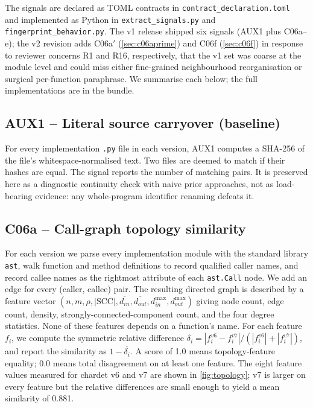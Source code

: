 \documentclass[11pt,letterpaper]{article}
\begin{document}
The signals are declared as TOML contracts in
\texttt{contract\_declaration.toml}~\cite{verivus2026dagtoml} and
implemented as Python in \texttt{extract\_signals.py} and
\texttt{fingerprint\_behavior.py}. The v1 release shipped six
signals (AUX1 plus C06a--e); the v2 revision adds C06a$'$
(\cref{sec:c06aprime}) and C06f (\cref{sec:c06f}) in response to
reviewer concerns R1 and R16, respectively, that the v1 set was
coarse at the module level and could miss either fine-grained
neighbourhood reorganisation or surgical per-function paraphrase.
We summarise each below; the full implementations are in the
bundle.

\subsection{AUX1 -- Literal source carryover (baseline)}
\label{sec:aux1}
For every implementation \texttt{.py} file in each version, AUX1
computes a SHA-256 of the file's whitespace-normalised text. Two
files are deemed to match if their hashes are equal. The signal
reports the number of matching pairs. It is preserved here as a
diagnostic continuity check with naive prior approaches, not as
load-bearing evidence: any whole-program identifier renaming defeats
it.

\subsection{C06a -- Call-graph topology similarity}
\label{sec:c06a}
For each version we parse every implementation module with the
standard library \texttt{ast}, walk function and method definitions
to record qualified caller names, and record callee names as the
rightmost attribute of each \texttt{ast.Call} node. We add an edge
for every (caller, callee) pair. The resulting directed graph is
described by a feature vector
$(n, m, \rho, |\mathrm{SCC}|, \overline{d_{in}}, \overline{d_{out}},
d_{in}^{\max}, d_{out}^{\max})$ giving node count, edge count,
density, strongly-connected-component count, and the four degree
statistics. None of these features depends on a function's name.
For each feature $f_i$, we compute the symmetric relative difference
$\delta_i = |f_i^{v6} - f_i^{v7}| / (|f_i^{v6}| + |f_i^{v7}|)$, and
report the similarity as $1 - \overline{\delta_i}$. A score of 1.0
means topology-feature equality; 0.0 means total disagreement on at
least one feature. The eight feature values measured for chardet
v6 and v7 are shown in \cref{fig:topology}; v7 is larger on every
feature but the relative differences are small enough to yield a
mean similarity of 0.881.
\end{document}
